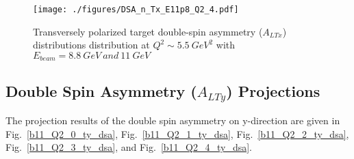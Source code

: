  \begin{sidewaysfigure}
 \begin{center}
  \texttt{[image: ./figures/DSA\_n\_Tx\_E11p8\_Q2\_4.pdf]}
  \caption{\footnotesize{Transversely polarized target double-spin asymmetry ($A_{LTx}$) distributions distribution at $Q^{2}\sim 5.5~GeV^{2}$ with $E_{beam}=8.8~GeV~and~11~GeV$}}
  \label{b11_Q2_4_tx_dsa}
 \end{center}
\end{sidewaysfigure}

\clearpage
\subsection{Double Spin Asymmetry ($A_{LTy}$) Projections}
The projection results of the double spin asymmetry on y-direction are given in Fig.~\ref{b11_Q2_0_ty_dsa}, Fig.~\ref{b11_Q2_1_ty_dsa}, Fig.~\ref{b11_Q2_2_ty_dsa}, Fig.~\ref{b11_Q2_3_ty_dsa}, and Fig.~\ref{b11_Q2_4_ty_dsa}. 

